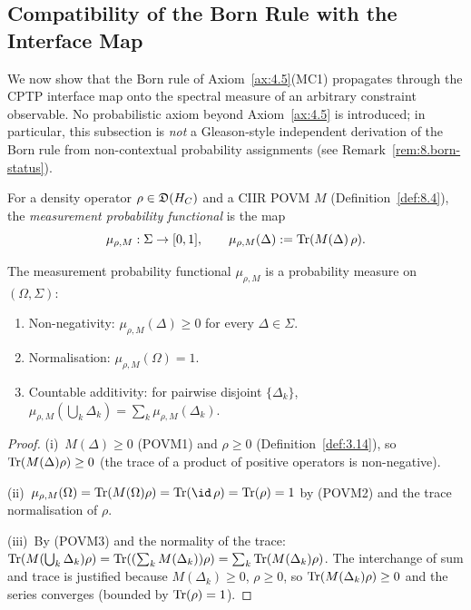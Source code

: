 \subsection{Compatibility of the Born Rule with the Interface Map}
\label{sec:ch8:born}

We now show that the Born rule of Axiom~\ref{ax:4.5}(MC1) propagates
through the CPTP interface map onto the spectral measure of an
arbitrary constraint observable.  No probabilistic axiom beyond
Axiom~\ref{ax:4.5} is introduced; in particular, this subsection is
\emph{not} a Gleason-style independent derivation of the Born rule
from non-contextual probability assignments
(see Remark~\ref{rem:8.born-status}).

\begin{definition}
\label{def:8.5}
For a density operator $\rho \in \mathfrak{D}(H_C)$ and a CIIR POVM
$M$ (Definition~\ref{def:8.4}), the \emph{measurement probability
functional} is the map
\[
  \mu_{\rho,M} : \Sigma \to [0,1],
  \qquad
  \mu_{\rho,M}(\Delta) := \mathrm{Tr}(M(\Delta)\,\rho).
\]
\end{definition}

\begin{lemma}
\label{lem:8.2}
The measurement probability functional $\mu_{\rho,M}$ is a probability
measure on $(\Omega, \Sigma)$:
\begin{enumerate}
  \item[\textup{(i)}] Non-negativity: $\mu_{\rho,M}(\Delta) \geq 0$
    for every $\Delta \in \Sigma$.
  \item[\textup{(ii)}] Normalisation:
    $\mu_{\rho,M}(\Omega) = 1$.
  \item[\textup{(iii)}] Countable additivity: for pairwise disjoint
    $\{\Delta_k\}$,
    $\mu_{\rho,M}(\bigcup_k \Delta_k)
    = \sum_k \mu_{\rho,M}(\Delta_k)$.
\end{enumerate}
\end{lemma}

\begin{proof}
(i)~$M(\Delta) \geq 0$ (POVM1) and $\rho \geq 0$
(Definition~\ref{def:3.14}), so
$\mathrm{Tr}(M(\Delta)\rho) \geq 0$ (the trace of a product of positive
operators is non-negative).

(ii)~$\mu_{\rho,M}(\Omega) = \Tr(M(\Omega)\rho)
= \Tr(\id\,\rho) = \Tr(\rho) = 1$ by (POVM2) and the trace
normalisation of $\rho$.

(iii)~By (POVM3) and the normality of the trace:
$\mathrm{Tr}(M(\bigcup_k \Delta_k)\rho)
= \mathrm{Tr}((\sum_k M(\Delta_k))\rho)
= \sum_k \mathrm{Tr}(M(\Delta_k)\rho)$.
The interchange of sum and trace is justified because
$M(\Delta_k) \geq 0$, $\rho \geq 0$, so
$\mathrm{Tr}(M(\Delta_k)\rho) \geq 0$ and the series converges
(bounded by $\mathrm{Tr}(\rho) = 1$).
\end{proof}

